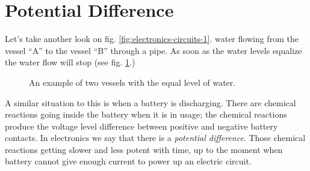 \documentclass[../sparc.tex]{subfiles}
\begin{document}
\section{Potential Difference}

Let's take another look on fig. \ref{fig:electronics-circuits-1}.  water flowing
from the vessel ``A'' to the vessel ``B'' through a pipe.  As soon as the water
levels equalize the water flow will stop (see
fig. \ref{fig:electronics-circuits-2}.)

\begin{figure}[ht]
  \centering
  \caption{An example of two vessels with the equal level of water.}
  \label{fig:electronics-circuits-2}
\end{figure}

A similar situation to this is when a battery is discharging.  There are
chemical reactions going inside the battery when it is in usage; the chemical
reactions produce the voltage level difference between positive and negative
battery contacts.  In electronics we say that there is a \emph{potential
difference}.  Those chemical reactions getting slower and less potent with time,
up to the moment when battery cannot give enough current to power up an electric
circuit.
\end{document}
